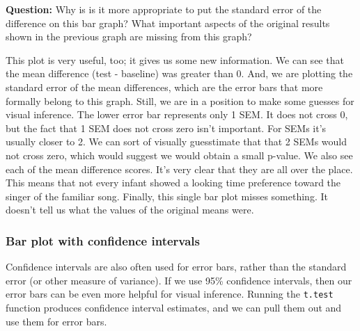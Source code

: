 \documentclass[
]{book}
\begin{document}
\textbf{Question:} Why is is it more appropriate to put the standard error of the difference on this bar graph? What important aspects of the original results shown in the previous graph are missing from this graph?

This plot is very useful, too; it gives us some new information. We can see that the mean difference (test - baseline) was greater than 0. And, we are plotting the standard error of the mean differences, which are the error bars that more formally belong to this graph. Still, we are in a position to make some guesses for visual inference. The lower error bar represents only 1 SEM. It does not cross 0, but the fact that 1 SEM does not cross zero isn't important. For SEMs it's usually closer to 2. We can sort of visually guesstimate that that 2 SEMs would not cross zero, which would suggest we would obtain a small p-value. We also see each of the mean difference scores. It's very clear that they are all over the place. This means that not every infant showed a looking time preference toward the singer of the familiar song. Finally, this single bar plot misses something. It doesn't tell us what the values of the original means were.

\hypertarget{bar-plot-with-confidence-intervals}{%
\subsubsection{Bar plot with confidence intervals}\label{bar-plot-with-confidence-intervals}}

Confidence intervals are also often used for error bars, rather than the standard error (or other measure of variance). If we use 95\% confidence intervals, then our error bars can be even more helpful for visual inference. Running the \texttt{t.test} function produces confidence interval estimates, and we can pull them out and use them for error bars.
\end{document}
